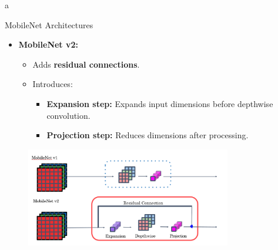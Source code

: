 a\documentclass[10pt]{beamer}
\theoremstyle{remark}
\theoremstyle{definition}
\begin{document}
\begin{frame}{MobileNet Architectures}
\begin{itemize}
    \item \textbf{MobileNet v2:}
    \begin{itemize}
        \item Adds \textbf{residual connections}.
        \item Introduces:
        \begin{itemize}
            \item \textbf{Expansion step:} Expands input dimensions before depthwise convolution.
            \item \textbf{Projection step:} Reduces dimensions after processing.
        \end{itemize}
    \end{itemize}
\end{itemize}
\begin{figure}
    \centering
    \includegraphics[width=0.8\textwidth,height=.7\textheight,keepaspectratio]{./images/MobileNet_1_and_2.png} 
\end{figure}
\end{frame}






\end{document}
